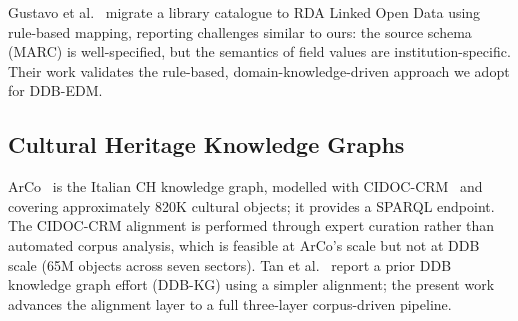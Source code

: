 Gustavo et al.~\cite{gustavo2018migration} migrate a library catalogue to RDA
Linked Open Data using rule-based mapping, reporting challenges similar to
ours: the source schema (MARC) is well-specified, but the semantics of field
values are institution-specific.
Their work validates the rule-based, domain-knowledge-driven approach we adopt
for DDB-EDM.


\subsection{Cultural Heritage Knowledge Graphs}

ArCo~\cite{carriero2019arco} is the Italian CH knowledge graph, modelled with
CIDOC-CRM~\cite{doerr2003crm} and covering approximately 820K cultural
objects; it provides a SPARQL endpoint.
The CIDOC-CRM alignment is performed through expert curation rather than
automated corpus analysis, which is feasible at ArCo's scale but not at
DDB scale (65M objects across seven sectors).
Tan et al.~\cite{tan2021ddbkg} report a prior DDB knowledge graph effort
(DDB-KG) using a simpler alignment; the present work advances the alignment
layer to a full three-layer corpus-driven pipeline.

